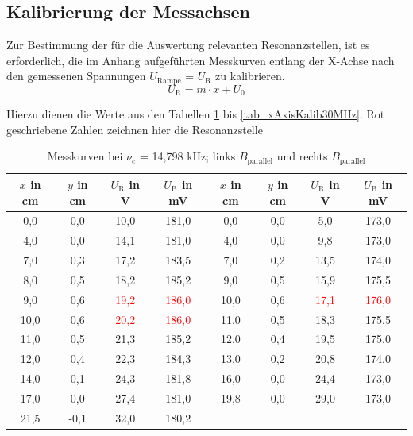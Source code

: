 \subsection{Kalibrierung der Messachsen}
\label{sec_Kalib}
Zur Bestimmung der für die Auswertung relevanten Resonanzstellen, ist es erforderlich, die im Anhang aufgeführten Messkurven entlang der X-Achse
nach den gemessenen Spannungen $U_\text{Rampe}$ = $U_\text{R}$ zu kalibrieren. 
\begin{equation}
 U_\text{R} = m\cdot x + U_0
\end{equation}

Hierzu dienen die Werte aus den Tabellen \ref{tab_xAxisKalib15MHz} bis
\ref{tab_xAxisKalib30MHz}. Rot geschriebene Zahlen zeichnen hier die Resonanzstelle
\renewcommand{\arraystretch}{1.2}
\begin{table}[H]
 \begin{tabular}{c|c|c|c||c|c|c|c}
  $x$ in cm & $y$ in cm & $U_\text{R}$ in V & $U_\text{B} $ in mV & $x$ in cm & $y$ in cm & $U_\text{R}$ in V & $U_\text{B}$ in mV \\
 \hline
 0,0&	0,0&	10,0&	181,0&	0,0&	0,0&		5,0&	173,0\\
4,0&	0,0&	14,1&	181,0&	4,0&	0,0&		9,8&	173,0\\
7,0&	0,3&	17,2&	183,5&	7,0&	0,2&		13,5&	174,0\\
8,0&	0,5&	18,2&	185,2&	9,0&	0,5&		15,9&	175,5\\
9,0&	0,6&	\textcolor{red}{19,2}&	\textcolor{red}{186,0}&	10,0&	0,6&		\textcolor{red}{17,1}&	\textcolor{red}{176,0}\\
10,0&	0,6&	\textcolor{red}{20,2}&	\textcolor{red}{186,0}&	11,0&	0,5&		18,3&	175,5\\
11,0&	0,5&	21,3&	185,2&	12,0&	0,4&		19,5&	175,0\\
12,0&	0,4&	22,3&	184,3&	13,0&	0,2&		20,8&	174,0\\
14,0&	0,1&	24,3&	181,8&	16,0&	0,0&		24,4&	173,0\\
17,0&	0,0&	27,4&	181,0&	19,8&	0,0&		29,0&	173,0\\ 
21,5&	-0,1&	32,0&	180,2&	&	&		&	\\

 \end{tabular}
 \caption{Messkurven bei $\nu_e$ = 14,798 kHz; links $B_\text{parallel}$ und rechts $B_\text{parallel}$}
 \label{tab_xAxisKalib15MHz}
\end{table}
